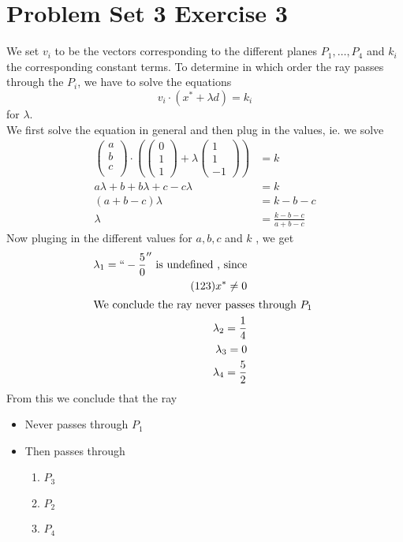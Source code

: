 \documentclass[11pt, a4paper]{article}
\begin{document}
\section{Problem Set 3 Exercise 3}
We set $v_i$ to be the vectors corresponding to the different planes $P_1,\ldots, P_4$  and $k_i$ the corresponding constant terms.
To determine in which order the ray passes through the $P_i$, we have to solve the equations
\[ 
v_i\cdot ( x^{*}+ \lambda d) = k_i
\]
for $\lambda$.\\
We first solve the equation in general and then plug in the values, ie. we solve
\begin{align*}
\begin{pmatrix}
a\\b\\c\\
\end{pmatrix} \cdot \left( 
	\begin{pmatrix}
		0\\1\\1
	\end{pmatrix} 
	+ \lambda 
	\begin{pmatrix}
	1 \\1\\-1
	\end{pmatrix} 	
\right) &=k\\
a\lambda + b + b\lambda + c -c\lambda &= k\\
( a+b-c) \lambda &= k -b-c\\
\lambda &= \frac{k-b-c}{a+b-c}
\end{align*}
Now pluging in the different values for $a,b,c$ and $k$ , we get
\begin{align*}
\lambda_1 = `` -\frac{5}{0}'' \text{ is undefined , since} \\
( 1 2 3) x^{*}\neq 0\\
\intertext{We conclude the ray never passes through $P_1$ }
\lambda_2= \frac{1}{4}\\
\lambda_3 = 0\\
\lambda_4= \frac{5}{2}	
\end{align*}
From this we conclude that the ray
\begin{itemize}
\item Never passes through $P_1$ 
\item Then passes through 
	\begin{enumerate}
	\item $P_3$ 
	\item $P_2$ 
	\item $P_4$ 
	\end{enumerate}
\end{itemize}
\end{document}
